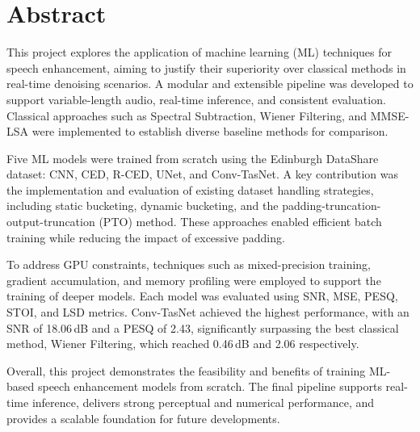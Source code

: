 \chapter*{Abstract}

This project explores the application of machine learning (ML) techniques for speech enhancement, aiming to justify their superiority over classical methods in real-time denoising scenarios. A modular and extensible pipeline was developed to support variable-length audio, real-time inference, and consistent evaluation. Classical approaches such as Spectral Subtraction, Wiener Filtering, and MMSE-LSA were implemented to establish diverse baseline methods for comparison.

Five ML models were trained from scratch using the Edinburgh DataShare dataset: CNN, CED, R-CED, UNet, and Conv-TasNet. A key contribution was the implementation and evaluation of existing dataset handling strategies, including static bucketing, dynamic bucketing, and the padding-truncation-output-truncation (PTO) method. These approaches enabled efficient batch training while reducing the impact of excessive padding.

To address GPU constraints, techniques such as mixed-precision training, gradient accumulation, and memory profiling were employed to support the training of deeper models. Each model was evaluated using SNR, MSE, PESQ, STOI, and LSD metrics. Conv-TasNet achieved the highest performance, with an SNR of 18.06 dB and a PESQ of 2.43, significantly surpassing the best classical method, Wiener Filtering, which reached 0.46 dB and 2.06 respectively.

Overall, this project demonstrates the feasibility and benefits of training ML-based speech enhancement models from scratch. The final pipeline supports real-time inference, delivers strong perceptual and numerical performance, and provides a scalable foundation for future developments.
